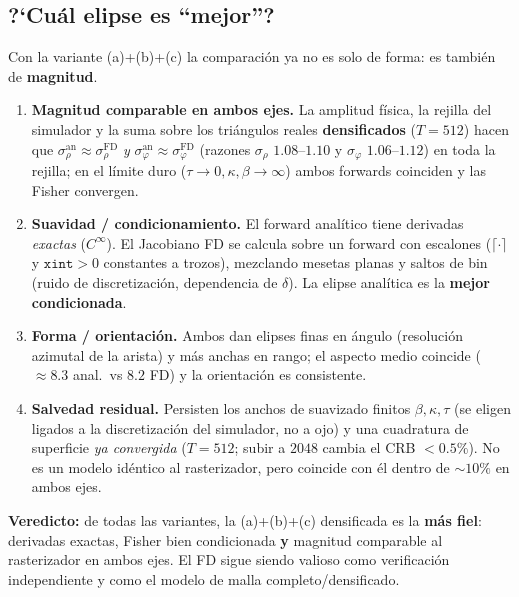 \documentclass[11pt,a4paper]{article}
\theoremstyle{plain}
\theoremstyle{definition}
\begin{document}
\subsection{\textup{?`}Cu\'al elipse es ``mejor''?}
Con la variante (a)+(b)+(c) la comparaci\'on ya no es solo de forma: es tambi\'en
de \textbf{magnitud}.
\begin{enumerate}[nosep]
    \item \textbf{Magnitud comparable en ambos ejes.} La amplitud f\'isica, la
    rejilla del simulador y la suma sobre los tri\'angulos reales
    \textbf{densificados} ($T=512$) hacen que
    $\sigma_\rho^{\mathrm{an}}\approx\sigma_\rho^{\mathrm{FD}}$ \emph{y}
    $\sigma_\varphi^{\mathrm{an}}\approx\sigma_\varphi^{\mathrm{FD}}$ (razones
    $\sigma_\rho$ $1.08$--$1.10$ y $\sigma_\varphi$ $1.06$--$1.12$) en toda la
    rejilla; en el l\'imite duro
    ($\tau\to0,\kappa,\beta\to\infty$) ambos forwards coinciden y las Fisher
    convergen.
    \item \textbf{Suavidad / condicionamiento.} El forward anal\'itico tiene
    derivadas \emph{exactas} ($C^\infty$). El Jacobiano FD se calcula sobre un
    forward con escalones ($\lceil\cdot\rceil$ y $\texttt{xint}>0$ constantes a
    trozos), mezclando mesetas planas y saltos de bin (ruido de discretizaci\'on,
    dependencia de $\delta$). La elipse anal\'itica es la \textbf{mejor
    condicionada}.
    \item \textbf{Forma / orientaci\'on.} Ambos dan elipses finas en \'angulo
    (resoluci\'on azimutal de la arista) y m\'as anchas en rango; el aspecto medio
    coincide ($\approx8.3$ anal.\ vs $8.2$ FD) y la orientaci\'on es consistente.
    \item \textbf{Salvedad residual.} Persisten los anchos de suavizado finitos
    $\beta,\kappa,\tau$ (se eligen ligados a la discretizaci\'on del simulador, no a
    ojo) y una cuadratura de superficie \emph{ya convergida} ($T=512$; subir a
    $2048$ cambia el CRB $<0.5\%$). No es un modelo id\'entico al rasterizador, pero
    coincide con \'el dentro de $\sim\!10\%$ en ambos ejes.
\end{enumerate}
\textbf{Veredicto:} de todas las variantes, la (a)+(b)+(c) densificada es la
\textbf{m\'as fiel}: derivadas exactas, Fisher bien condicionada \textbf{y} magnitud
comparable al rasterizador en ambos ejes. El FD sigue siendo valioso como
verificaci\'on independiente y
como el modelo de malla completo/densificado.

\end{document}
